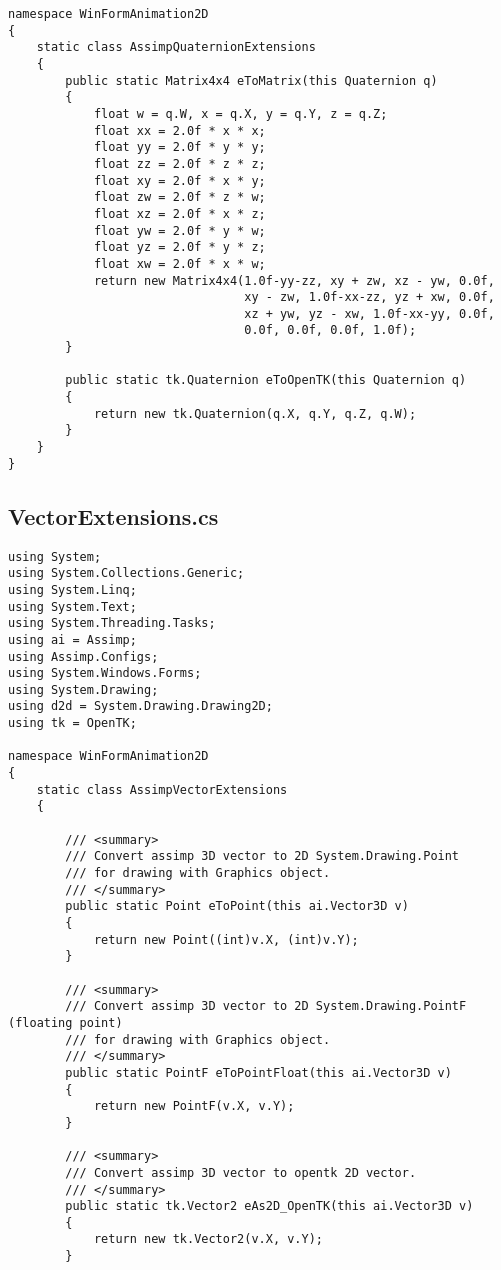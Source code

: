 \begin{scriptsize}
\begin{verbatim}
namespace WinFormAnimation2D
{
    static class AssimpQuaternionExtensions
    {
        public static Matrix4x4 eToMatrix(this Quaternion q)
        {
            float w = q.W, x = q.X, y = q.Y, z = q.Z;
            float xx = 2.0f * x * x;
            float yy = 2.0f * y * y;
            float zz = 2.0f * z * z;
            float xy = 2.0f * x * y;
            float zw = 2.0f * z * w;
            float xz = 2.0f * x * z;
            float yw = 2.0f * y * w;
            float yz = 2.0f * y * z;
            float xw = 2.0f * x * w;
            return new Matrix4x4(1.0f-yy-zz, xy + zw, xz - yw, 0.0f,
                                 xy - zw, 1.0f-xx-zz, yz + xw, 0.0f,
                                 xz + yw, yz - xw, 1.0f-xx-yy, 0.0f,
                                 0.0f, 0.0f, 0.0f, 1.0f);
        }

        public static tk.Quaternion eToOpenTK(this Quaternion q)
        {
            return new tk.Quaternion(q.X, q.Y, q.Z, q.W);
        }
    }
}

\end{verbatim}
\subsection{VectorExtensions.cs}
\begin{verbatim}
using System;
using System.Collections.Generic;
using System.Linq;
using System.Text;
using System.Threading.Tasks;
using ai = Assimp;
using Assimp.Configs;
using System.Windows.Forms;
using System.Drawing;
using d2d = System.Drawing.Drawing2D;
using tk = OpenTK;

namespace WinFormAnimation2D
{
    static class AssimpVectorExtensions
    {

        /// <summary>
        /// Convert assimp 3D vector to 2D System.Drawing.Point
        /// for drawing with Graphics object.
        /// </summary>
        public static Point eToPoint(this ai.Vector3D v)
        {
            return new Point((int)v.X, (int)v.Y);
        }

        /// <summary>
        /// Convert assimp 3D vector to 2D System.Drawing.PointF (floating point)
        /// for drawing with Graphics object.
        /// </summary>
        public static PointF eToPointFloat(this ai.Vector3D v)
        {
            return new PointF(v.X, v.Y);
        }

        /// <summary>
        /// Convert assimp 3D vector to opentk 2D vector.
        /// </summary>
        public static tk.Vector2 eAs2D_OpenTK(this ai.Vector3D v)
        {
            return new tk.Vector2(v.X, v.Y);
        }


\end{verbatim}
\end{scriptsize}
